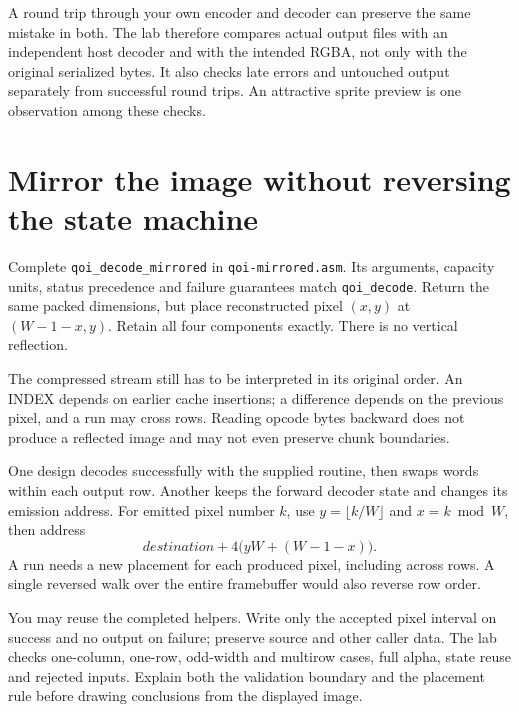 A round trip through your own encoder and decoder can preserve the same mistake
in both. The lab therefore compares actual output files with an independent
host decoder and with the intended RGBA, not only with the original serialized
bytes. It also checks late errors and untouched output separately from successful
round trips. An attractive sprite preview is one observation among these checks.

\section{Mirror the image without reversing the state machine}

Complete \texttt{qoi\_decode\_mirrored} in \texttt{qoi-mirrored.asm}. Its arguments,
capacity units, status precedence and failure guarantees match \texttt{qoi\_decode}.
Return the same packed dimensions, but place reconstructed pixel $(x,y)$ at
$(W-1-x,y)$. Retain all four components exactly. There is no vertical reflection.

The compressed stream still has to be interpreted in its original order.
An INDEX depends on earlier cache insertions; a difference depends on the previous
pixel, and a run may cross rows. Reading opcode bytes backward does not produce
a reflected image and may not even preserve chunk boundaries.

One design decodes successfully with the supplied routine, then swaps words
within each output row. Another keeps the forward decoder state and changes
its emission address. For emitted pixel number $k$, use $y=\lfloor k/W\rfloor$
and $x=k\bmod W$, then address
\[
  destination+4\bigl(yW+(W-1-x)\bigr).
\]
A run needs a new placement for each produced pixel, including across rows.
A single reversed walk over the entire framebuffer would also reverse row order.

You may reuse the completed helpers. Write only the accepted pixel interval
on success and no output on failure; preserve source and other caller data.
The lab checks one-column, one-row, odd-width and multirow cases, full alpha,
state reuse and rejected inputs. Explain both the validation boundary and the
placement rule before drawing conclusions from the displayed image.
